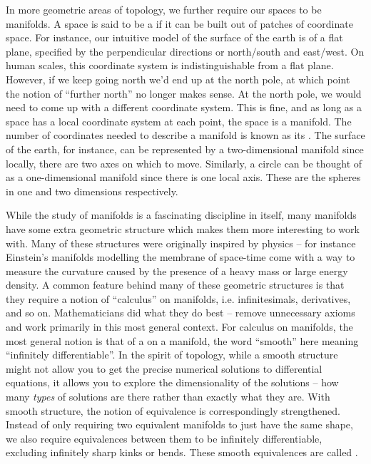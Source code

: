 In more geometric areas of topology, we further require our spaces to be manifolds.
A space is said to be a  if it can be built out of patches of coordinate space. For instance, our intuitive model of the surface of the earth is of a flat plane, specified by the perpendicular directions or north/south and east/west. On human scales, this coordinate system is indistinguishable from a flat plane. However, if we keep going north we'd end up at the north pole, at which point the notion of ``further north'' no longer makes sense. At the north pole, we would need to come up with a different coordinate system. This is fine, and as long as a space has a local coordinate system at each point, the space is a manifold. The number of coordinates needed to describe a manifold is known as its . The surface of the earth, for instance, can be represented by a two-dimensional manifold since locally, there are two axes on which to move. Similarly, a circle can be thought of as a one-dimensional manifold since there is one local axis. These are the spheres in one and two dimensions respectively.

While the study of manifolds is a fascinating discipline in itself, many manifolds have some extra geometric structure which makes them more interesting to work with. Many of these structures were originally inspired by physics -- for instance Einstein's manifolds modelling the membrane of space-time come with a way to measure the curvature caused by the presence of a heavy mass or large energy density.
A common feature behind many of these geometric structures is that they require a notion of ``calculus'' on manifolds, i.e. infinitesimals, derivatives, and so on. Mathematicians did what they do best -- remove unnecessary axioms and work primarily in this most general context. For calculus on manifolds, the most general notion is that of a  on a manifold, the word ``smooth'' here meaning ``infinitely differentiable''. In the spirit of topology, while a smooth structure might not allow you to get the precise numerical solutions to differential equations, it allows you to explore the dimensionality of the solutions -- how many \emph{types} of solutions are there rather than exactly what they are. 
With smooth structure, the notion of equivalence is correspondingly strengthened.
Instead of only requiring two equivalent manifolds to just have the same shape, we also require equivalences between them to be infinitely differentiable, excluding infinitely sharp kinks or bends. These smooth equivalences are called .

